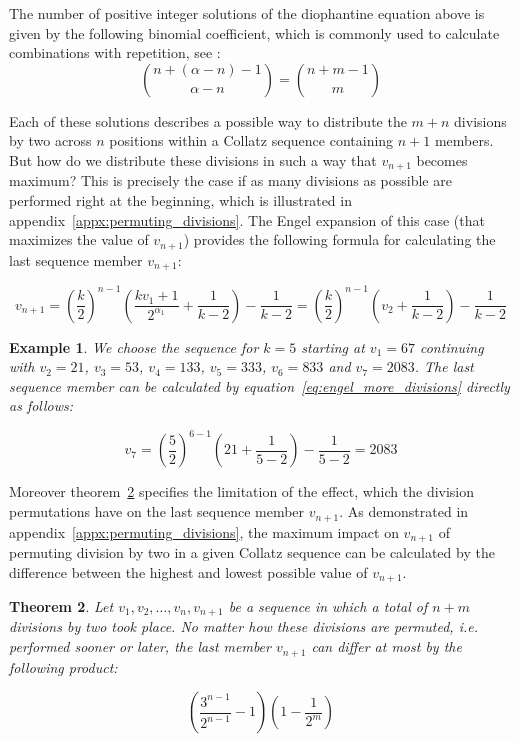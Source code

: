 \documentclass[12pt]{amsart}
\newtheorem{theorem}{Theorem}[section]
\newtheorem{example}[theorem]{Example}
\theoremstyle{definition}
\begin{document}
The number of positive integer solutions of the diophantine equation above is given by the following binomial coefficient, which is commonly used to calculate combinations with repetition, see \cite[p.~54]{Ref_Brualdi_2010}:
\[
\binom{n+(\alpha-n)-1}{\alpha-n}=\binom{n+m-1}{m}
\]

Each of these solutions describes a possible way to distribute the $m+n$ divisions by two across $n$ positions within a Collatz sequence containing $n+1$ members. But how do we distribute these divisions in such a way that $v_{n+1}$ becomes maximum? This is precisely the case if as many divisions as possible are performed right at the beginning, which is illustrated in appendix~\ref{appx:permuting_divisions}. The Engel expansion of this case (that maximizes the value of $v_{n+1}$) provides the following formula for calculating the last sequence member $v_{n+1}$:

\begin{equation}
\label{eq:engel_more_divisions}
v_{n+1}=\left(\frac{k}{2}\right)^{n-1}\left(\frac{kv_1+1}{2^{\alpha_1}}+\frac{1}{k-2}\right)-\frac{1}{k-2}=\left(\frac{k}{2}\right)^{n-1}\left(v_2+\frac{1}{k-2}\right)-\frac{1}{k-2}
\end{equation}

\medskip
\begin{example}
	\label{ex:engel_67}
	We choose the sequence for $k=5$ starting at $v_1=67$ continuing with $v_2=21$, $v_3=53$, $v_4=133$, $v_5=333$, $v_6=833$ and $v_7=2083$. The last sequence member can be calculated by equation~\ref{eq:engel_more_divisions} directly as follows:
	
	\[
	v_7=\left(\frac{5}{2}\right)^{6-1}\left(21+\frac{1}{5-2}\right)-\frac{1}{5-2}=2083
	\]
\end{example}

\par\medskip\noindent
Moreover theorem~\ref{theo:permutation} specifies the limitation of the effect, which the division permutations have on the last sequence member $v_{n+1}$. As demonstrated in appendix~\ref{appx:permuting_divisions}, the maximum impact on $v_{n+1}$ of permuting division by two in a given Collatz sequence can be calculated by the difference between the highest and lowest possible value of $v_{n+1}$.

\par\medskip
\begin{theorem}
	\label{theo:permutation}
	Let $v_1,v_2,\ldots,v_n,v_{n+1}$ be a sequence in which a total of $n+m$ divisions by two took place. No matter how these divisions are permuted, i.e. performed sooner or later, the last member $v_{n+1}$ can differ at most by the following product:
	
	\[
	\left(\frac{3^{n-1}}{2^{n-1}}-1\right)\left(1-\frac{1}{2^m}\right)
	\]
\end{theorem}
\end{document}
